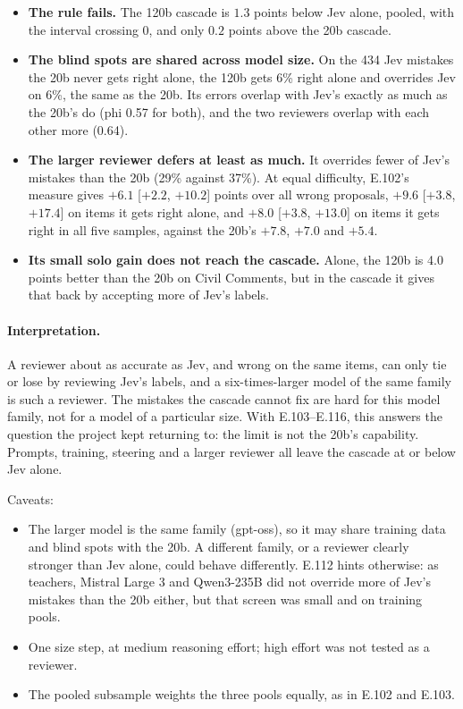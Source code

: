 \documentclass[11pt]{article}
\renewcommand{\_}{\origunderscore\allowbreak}
\begin{document}
\begin{itemize}[leftmargin=*]
  \item \textbf{The rule fails.} The 120b cascade is $1.3$ points below Jev alone, pooled, with the interval crossing 0, and only $0.2$ points above the 20b cascade.
  \item \textbf{The blind spots are shared across model size.} On the 434 Jev mistakes the 20b never gets right alone, the 120b gets 6\% right alone and overrides Jev on 6\%, the same as the 20b. Its errors overlap with Jev's exactly as much as the 20b's do (phi 0.57 for both), and the two reviewers overlap with each other more (0.64).
  \item \textbf{The larger reviewer defers at least as much.} It overrides fewer of Jev's mistakes than the 20b (29\% against 37\%). At equal difficulty, E.102's measure gives $+6.1$ [$+2.2$, $+10.2$] points over all wrong proposals, $+9.6$ [$+3.8$, $+17.4$] on items it gets right alone, and $+8.0$ [$+3.8$, $+13.0$] on items it gets right in all five samples, against the 20b's $+7.8$, $+7.0$ and $+5.4$.
  \item \textbf{Its small solo gain does not reach the cascade.} Alone, the 120b is 4.0 points better than the 20b on Civil Comments, but in the cascade it gives that back by accepting more of Jev's labels.
\end{itemize}

\paragraph{Interpretation.}
A reviewer about as accurate as Jev, and wrong on the same items, can only tie or lose by reviewing Jev's labels, and a six-times-larger model of the same family is such a reviewer. The mistakes the cascade cannot fix are hard for this model family, not for a model of a particular size. With E.103--E.116, this answers the question the project kept returning to: the limit is not the 20b's capability. Prompts, training, steering and a larger reviewer all leave the cascade at or below Jev alone.

Caveats:
\begin{itemize}[leftmargin=*,itemsep=2pt]
  \item The larger model is the same family (gpt-oss), so it may share training data and blind spots with the 20b. A different family, or a reviewer clearly stronger than Jev alone, could behave differently. E.112 hints otherwise: as teachers, Mistral Large 3 and Qwen3-235B did not override more of Jev's mistakes than the 20b either, but that screen was small and on training pools.
  \item One size step, at medium reasoning effort; high effort was not tested as a reviewer.
  \item The pooled subsample weights the three pools equally, as in E.102 and E.103.
\end{itemize}
\end{document}
